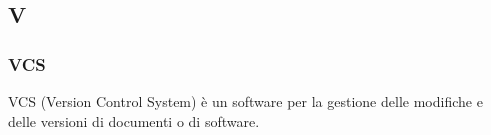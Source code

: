 \subsection*{\textbf{\hfill \Huge{V} \hfill}} 
\subsubsection*{VCS}
VCS (Version Control System) è un software per la gestione delle modifiche e delle versioni di documenti o di software.
